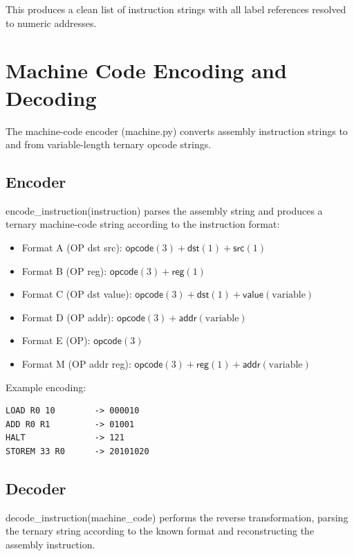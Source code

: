 \documentclass[12pt,a4paper,twoside]{book}
\theoremstyle{trinarytheorem}
\theoremstyle{trinarydefinition}
\newcommand{\code}[1]{\textsf{#1}}
\begin{document}
This produces a clean list of instruction strings with all label references resolved
to numeric addresses.

\chapter{Machine Code Encoding and Decoding}
\label{ch:machine}

The machine-code encoder (\code{machine.py}) converts assembly instruction strings
to and from variable-length ternary opcode strings.

\section{Encoder}

\code{encode\_instruction(instruction)} parses the assembly string and produces a
ternary machine-code string according to the instruction format:

\begin{itemize}
    \item Format A (\code{OP dst src}): $\code{opcode}(3) + \code{dst}(1) +
          \code{src}(1)$
    \item Format B (\code{OP reg}): $\code{opcode}(3) + \code{reg}(1)$
    \item Format C (\code{OP dst value}): $\code{opcode}(3) + \code{dst}(1) +
          \code{value}(\text{variable})$
    \item Format D (\code{OP addr}): $\code{opcode}(3) + \code{addr}(\text{variable})$
    \item Format E (\code{OP}): $\code{opcode}(3)$
    \item Format M (\code{OP addr reg}): $\code{opcode}(3) + \code{reg}(1) +
          \code{addr}(\text{variable})$
\end{itemize}

Example encoding:
\begin{lstlisting}
LOAD R0 10        -> 000010
ADD R0 R1         -> 01001
HALT              -> 121
STOREM 33 R0      -> 20101020
\end{lstlisting}

\section{Decoder}

\code{decode\_instruction(machine\_code)} performs the reverse transformation,
parsing the ternary string according to the known format and reconstructing the
assembly instruction.
\end{document}
